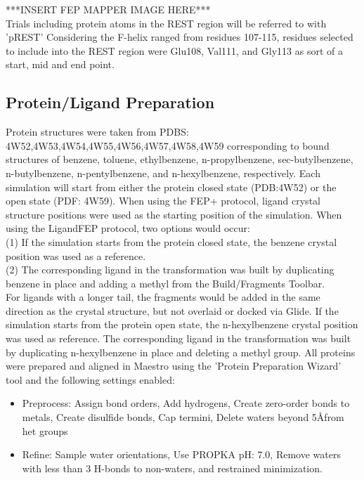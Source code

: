 \documentclass[journal=jctcce,manuscript=article]{achemso}
\begin{document}
***INSERT FEP MAPPER IMAGE HERE***\\

Trials including protein atoms in the REST region will be referred to with 'pREST'
Considering the F-helix ranged from residues 107-115, residues selected to include into the REST region were Glu108, Val111, and Gly113 as sort of a start, mid and end point.

\subsection{Protein/Ligand Preparation}
Protein structures were taken from PDBS: 4W52,4W53,4W54,4W55,4W56,4W57,4W58,4W59 corresponding to bound structures of benzene, toluene, ethylbenzene, n-propylbenzene, sec-butylbenzene, n-butylbenzene, n-pentylbenzene, and n-hexylbenzene, respectively.
Each simulation will start from either the protein closed state (PDB:4W52) or the open state (PDF: 4W59).
When using the FEP+ protocol, ligand crystal structure positions were used as the starting position of the simulation.
When using the LigandFEP protocol, two options would occur:\\
(1) If the simulation starts from the protein closed state, the benzene crystal position was used as a reference.\\
(2) The corresponding ligand in the transformation was built by duplicating benzene in place and adding a methyl from the Build/Fragments Toolbar.\\

For ligands with a longer tail, the fragments would be added in the same direction as the crystal structure, but not overlaid or docked via Glide.
If the simulation starts from the protein open state, the n-hexylbenzene crystal position was used as reference.
The corresponding ligand in the transformation was built by duplicating n-hexylbenzene in place and deleting a methyl group.
All proteins were prepared and aligned in Maestro using the 'Protein Preparation Wizard' tool and the following settings enabled:
   \begin{itemize}
   \item Preprocess: Assign bond orders, Add hydrogens, Create zero-order bonds to metals, Create disulfide bonds, Cap termini, Delete waters beyond 5\AA from het groups
   \item Refine: Sample water orientations, Use PROPKA pH: 7.0, Remove waters with less than 3 H-bonds to non-waters, and restrained minimization.
   \end{itemize}
\end{document}
